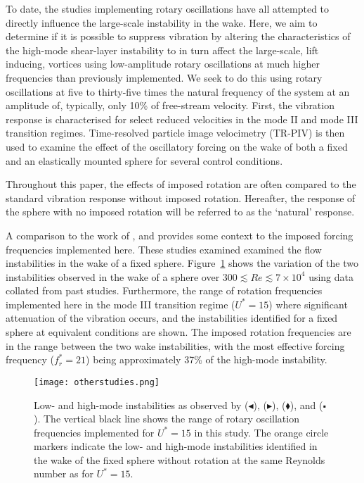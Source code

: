 \documentclass[3p]{elsarticle}
\newcommand{\Ustar}{\ensuremath{U^{*}}}
\newcommand{\freqrat}{\ensuremath{f_r^*}}
\begin{document}
To date, the studies implementing rotary oscillations
\citep[e.g.,][]{Sareen2018b,Sareen2019,McQueen2020} have all attempted
to directly influence the large-scale instability in the wake. Here,
we aim to determine if it is possible to suppress vibration by
altering the characteristics of the high-mode shear-layer instability
to in turn affect the large-scale, lift inducing, vortices using
low-amplitude rotary oscillations at much higher frequencies than
previously implemented. We seek to do this
using rotary oscillations at five to thirty-five times
the natural frequency of the system at an amplitude of, typically,
only 10\% of free-stream velocity. First, the
vibration response is characterised for select reduced velocities in
the mode II and mode III transition regimes. Time-resolved particle
image velocimetry (TR-PIV) is then used to examine the effect of the
oscillatory forcing on the wake of both a fixed and an elastically
mounted sphere for several control conditions.

Throughout this paper, the effects of imposed rotation are often
compared to the standard vibration response without imposed rotation.
Hereafter, the response of the sphere with no imposed rotation will be
referred to as the `natural' response.

A comparison to the work of
\citet{Achenbach1974,Kim1988,Sakamoto1990}, and \citet{Yun2006} provides 
some context to the imposed forcing frequencies implemented 
here. These studies examined examined the flow instabilities in the wake of a fixed
sphere. Figure~\ref{fig:otherstudies} shows the variation of the two
instabilities observed in the wake of a sphere over $300 \lesssim Re \lesssim 7 \times 10 ^4$ using data collated from past studies. Furthermore, the range of rotation frequencies implemented here in the mode III transition regime ($\Ustar=15$) where significant attenuation of the vibration occurs,  and the instabilities identified for a fixed sphere at equivalent conditions are shown. The imposed rotation frequencies are in the range between the
two wake instabilities, with the most effective forcing frequency
($\freqrat=21$) being approximately 37\% of the high-mode instability.
%
\begin{figure}
	\centering
	\texttt{[image: otherstudies.png]} %
	\caption{Low- and high-mode instabilities as observed by
		\cite{Achenbach1974} ($\smallblacktriangleleft$), \cite{Kim1988}
		($\smallblacktriangleright$), \cite{Sakamoto1990}
		($\mdblklozenge$), and \cite{Yun2006} ($\smblksquare$). The
		vertical black line shows the range of rotary oscillation
		frequencies implemented for $\Ustar=15$ in this study. The
		orange circle markers indicate the low- and high-mode
		instabilities identified in the wake of the fixed sphere without
		rotation at the same Reynolds number as for $\Ustar=15$.}
	\label{fig:otherstudies}                                            
\end{figure}
%
\end{document}
